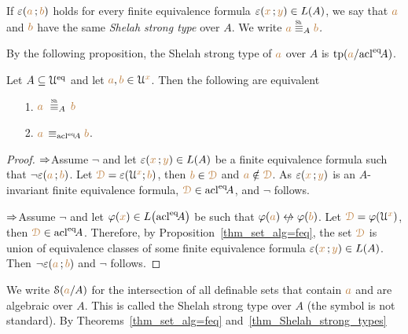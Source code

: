 \begin{definition}\label{def_Sh_strong_type}
  If $\varepsilon({\color{brown} a}\,;{\color{brown} b})$ holds for every finite equivalence formula $\varepsilon({\color{brown} x}\,;{\color{brown} y})\in L(A)$, we say that ${\color{brown} a}$ and ${\color{brown} b}$ have the same \emph{Shelah strong type\/} over $A$.
  We write \emph{${\mr a}\stackrel{\scalebox{.5}{\rm Sh}}{\equiv}_A{\mr b}$.}
\end{definition}

By the following proposition, the Shelah strong type of ${\color{brown} a}$ over $A$ is ${\rm tp}({\color{brown} a}/{\rm acl}^{{\rm eq}}\!A)$.

\begin{theorem}\label{thm_Shelah_strong_types}
Let $A\subseteq\EuScript U^{{\rm eq}}$ and let ${\color{brown} a},{\color{brown} b}\in\EuScript U^{\color{brown} x}$.
Then the following are equivalent\nobreak
\begin{itemize}
\item[1.]  ${\mr a}\ \equivSh_A\, {\mr b}$
\item[2.]  ${\color{brown} a}\,\equiv_{{\rm acl}^{{\rm eq}}\! A}{\color{brown} b}$.
\end{itemize} 
\end{theorem}
\begin{proof}
$\Rightarrow$\quad Assume $\neg$ and let $\varepsilon({\color{brown} x}\,;{\color{brown} y})\in L(A)$ be a finite equivalence formula such that $\neg\varepsilon({\color{brown} a}\,;{\color{brown} b})$.
Let ${\color{brown}\EuScript D}=\varepsilon(\EuScript U^{\color{brown} x};{\color{brown} b})$, then  ${\color{brown} b}\in{\color{brown}\EuScript D}$ and ${\color{brown} a}\notin{\color{brown}\EuScript D}$.
As $\varepsilon({\color{brown} x}\,;{\color{brown} y})$ is an $A$-invariant finite equivalence formula, ${\color{brown}\EuScript D}\in{\rm acl}^{{\rm eq}}\!A$, and $\neg$ follows.

$\Rightarrow$\quad Assume $\neg$ and let $\varphi({\color{brown} x})\in L\big({\rm acl}^{{\rm eq}}\!A\big)$ be  such that $\phi({\mr a})\niff\phi({\mr b})$.
Let ${\color{brown}\EuScript D}=\varphi(\EuScript U^{\color{brown} x})$, then ${\color{brown}\EuScript D}\in{\rm acl}^{{\rm eq}}\!A$.
Therefore, by Proposition~\ref{thm_set_alg=feq}, the set ${\color{brown}\EuScript D}$ is union of equivalence classes of some finite equivalence formula $\varepsilon({\color{brown} x}\,;{\color{brown} y})\in L(A)$.
Then $\neg\varepsilon({\color{brown} a}\,;{\color{brown} b})$ and $\neg$ follows.
\end{proof}

We write \emph{$\EuScript S({\color{brown} a}/A)$\/} for the intersection of all definable sets that contain ${\color{brown} a}$ and are algebraic over $A$.
This is called the Shelah strong type over $A$ (the symbol is not standard).
By Theorems~\ref{thm_set_alg=feq} and~\ref{thm_Shelah_strong_types} 


